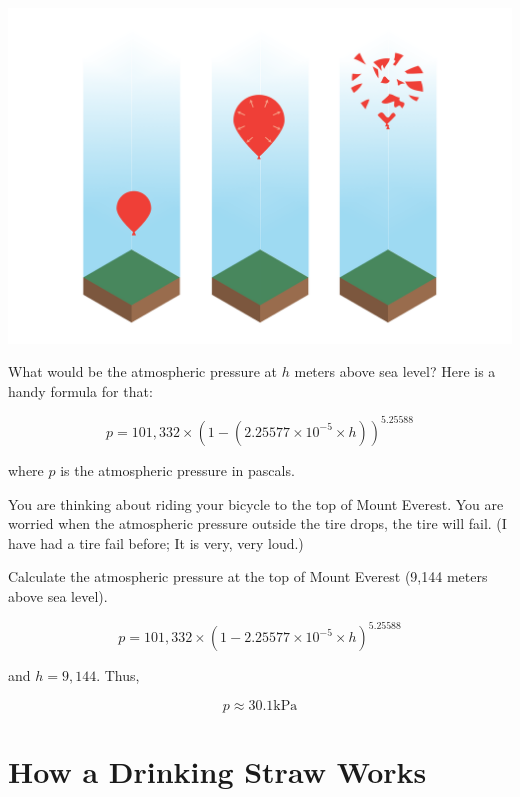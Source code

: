 \includegraphics[width=\textwidth]{balloonColumn.png}

What would be the atmospheric pressure at $h$ meters above sea level?  Here is a handy formula for that:

$$p = 101,332 \times \left(1 - \left( 2.25577 \times 10^{-5} \times h\right) \right)^{5.25588}$$

where $p$ is the atmospheric pressure in pascals.

\begin{Exercise}[title={Atmospheric Pressure},  label=atmos_pressure]
  
You are thinking about riding your bicycle to the top of Mount Everest.  You are worried when the atmospheric pressure outside the tire drops,  the tire will fail.  
(I have had a tire fail before; It is very, very loud.)  

Calculate the atmospheric pressure at the top of Mount Everest (9,144 meters above sea level).

\end{Exercise}
\begin{Answer}[ref=atmos_pressure]

$$p = 101,332 \times \left(1 - 2.25577 \times 10^{-5} \times h\right)^{5.25588}$$

and $h = 9,144$.  Thus,

$$p \approx 30.1 \text{kPa}$$

\end{Answer}

\section{How a Drinking Straw Works}

